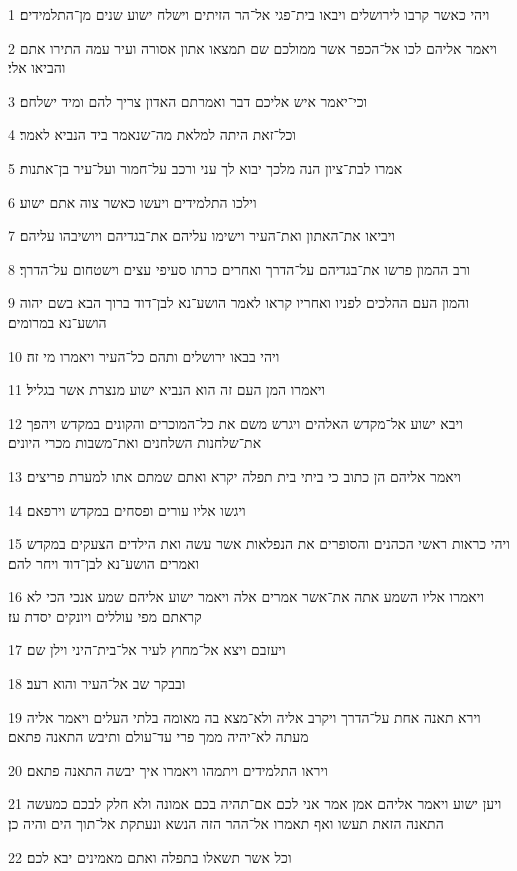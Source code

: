 \par 1 ויהי כאשר קרבו לירושלים ויבאו בית־פגי אל־הר הזיתים וישלח ישוע שנים מן־התלמידים׃
\par 2 ויאמר אליהם לכו אל־הכפר אשר ממולכם שם תמצאו אתון אסורה ועיר עמה התירו אתם והביאו אלי׃
\par 3 וכי־יאמר איש אליכם דבר ואמרתם האדון צריך להם ומיד ישלחם׃
\par 4 וכל־זאת היתה למלאת מה־שנאמר ביד הנביא לאמר׃
\par 5 אמרו לבת־ציון הנה מלכך יבוא לך עני ורכב על־חמור ועל־עיר בן־אתנות׃
\par 6 וילכו התלמידים ויעשו כאשר צוה אתם ישוע׃
\par 7 ויביאו את־האתון ואת־העיר וישימו עליהם את־בגדיהם ויושיבהו עליהם׃
\par 8 ורב ההמון פרשו את־בגדיהם על־הדרך ואחרים כרתו סעיפי עצים וישטחום על־הדרך׃
\par 9 והמון העם ההלכים לפניו ואחריו קראו לאמר הושע־נא לבן־דוד ברוך הבא בשם יהוה הושע־נא במרומים׃
\par 10 ויהי בבאו ירושלים ותהם כל־העיר ויאמרו מי זה׃
\par 11 ויאמרו המן העם זה הוא הנביא ישוע מנצרת אשר בגליל׃
\par 12 ויבא ישוע אל־מקדש האלהים ויגרש משם את כל־המוכרים והקונים במקדש ויהפך את־שלחנות השלחנים ואת־משבות מכרי היונים׃
\par 13 ויאמר אליהם הן כתוב כי ביתי בית תפלה יקרא ואתם שמתם אתו למערת פריצים׃
\par 14 ויגשו אליו עורים ופסחים במקדש וירפאם׃
\par 15 ויהי כראות ראשי הכהנים והסופרים את הנפלאות אשר עשה ואת הילדים הצעקים במקדש ואמרים הושע־נא לבן־דוד ויחר להם׃
\par 16 ויאמרו אליו השמע אתה את־אשר אמרים אלה ויאמר ישוע אליהם שמע אנכי הכי לא קראתם מפי עוללים ויונקים יסדת עז׃
\par 17 ויעזבם ויצא אל־מחוץ לעיר אל־בית־היני וילן שם׃
\par 18 ובבקר שב אל־העיר והוא רעב׃
\par 19 וירא תאנה אחת על־הדרך ויקרב אליה ולא־מצא בה מאומה בלתי העלים ויאמר אליה מעתה לא־יהיה ממך פרי עד־עולם ותיבש התאנה פתאם׃
\par 20 ויראו התלמידים ויתמהו ויאמרו איך יבשה התאנה פתאם׃
\par 21 ויען ישוע ויאמר אליהם אמן אמר אני לכם אם־תהיה בכם אמונה ולא חלק לבכם כמעשה התאנה הזאת תעשו ואף תאמרו אל־ההר הזה הנשא ונעתקת אל־תוך הים והיה כן׃
\par 22 וכל אשר תשאלו בתפלה ואתם מאמינים יבא לכם׃
